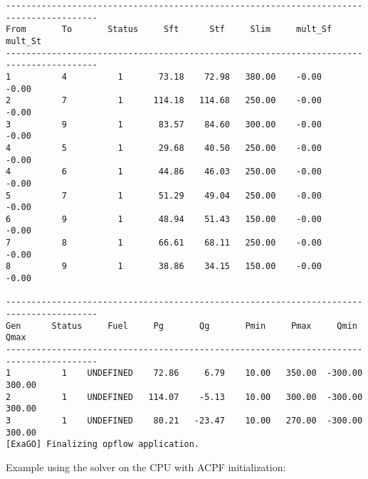\begin{lstlisting}
----------------------------------------------------------------------------------------
From       To       Status     Sft      Stf     Slim     mult_Sf  mult_St 
----------------------------------------------------------------------------------------
1          4          1       73.18    72.98   380.00    -0.00    -0.00
2          7          1      114.18   114.68   250.00    -0.00    -0.00
3          9          1       83.57    84.60   300.00    -0.00    -0.00
4          5          1       29.68    40.50   250.00    -0.00    -0.00
4          6          1       44.86    46.03   250.00    -0.00    -0.00
5          7          1       51.29    49.04   250.00    -0.00    -0.00
6          9          1       48.94    51.43   150.00    -0.00    -0.00
7          8          1       66.61    68.11   250.00    -0.00    -0.00
8          9          1       38.86    34.15   150.00    -0.00    -0.00

----------------------------------------------------------------------------------------
Gen      Status     Fuel     Pg       Qg       Pmin     Pmax     Qmin     Qmax  
----------------------------------------------------------------------------------------
1          1    UNDEFINED    72.86     6.79    10.00   350.00  -300.00   300.00
2          1    UNDEFINED   114.07    -5.13    10.00   300.00  -300.00   300.00
3          1    UNDEFINED    80.21   -23.47    10.00   270.00  -300.00   300.00
[ExaGO] Finalizing opflow application.
\end{lstlisting}

Example using the \hiop solver on the CPU with ACPF initialization:

